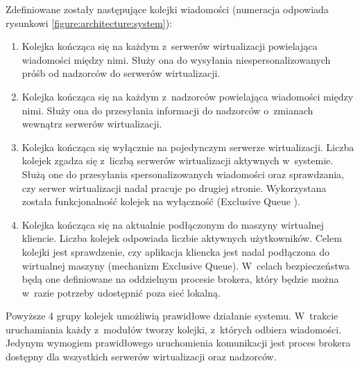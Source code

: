 \documentclass[../opis-rozwiazania.tex]{subfiles}
\begin{document}
Zdefiniowane zostały następujące kolejki wiadomości (numeracja odpowiada rysunkowi \ref{figure:architecture:system}):
\begin{enumerate}[label=(\Roman*)]
  \item \label{modules:broker:queue-virtsrv} Kolejka kończąca się na każdym z~serwerów wirtualizacji powielająca wiadomości między nimi.
        Służy ona do wysyłania niespersonalizowanych próśb od nadzorców do serwerów wirtualizacji.
  \item \label{modules:broker:queue-overseers} Kolejka kończąca się na każdym z~nadzorców powielająca wiadomości między nimi.
        Służy ona do przesyłania informacji do nadzorców o~zmianach wewnątrz serwerów wirtualizacji.
  \item \label{modules:broker:queue-exclusive} Kolejka kończąca się wyłącznie na pojedynczym serwerze wirtualizacji.
        Liczba kolejek zgadza się z~liczbą serwerów wirtualizacji aktywnych w~systemie.
        Służą one do przesyłania spersonalizowanych wiadomości oraz sprawdzania, czy serwer wirtualizacji nadal pracuje po drugiej stronie.
        Wykorzystana została funkcjonalność kolejek na wyłączność (Exclusive Queue \parencite{xrdp-clients}).
  \item \label{modules:broker:queue-users} Kolejka kończąca się na aktualnie podłączonym do maszyny wirtualnej kliencie.
        Liczba kolejek odpowiada liczbie aktywnych użytkowników.
        Celem kolejki jest sprawdzenie, czy aplikacja kliencka jest nadal podłączona do wirtualnej maszyny (mechanizm Exclusive Queue).
        W~celach bezpieczeństwa będą one definiowane na oddzielnym procesie brokera, który będzie można w~razie potrzeby udostępnić poza sieć lokalną.
\end{enumerate}

Powyższe 4 grupy kolejek umożliwią prawidłowe działanie systemu.
W~trakcie uruchamiania każdy z~modułów tworzy kolejki, z~których odbiera wiadomości.
Jedynym wymogiem prawidłowego uruchomienia komunikacji jest proces brokera dostępny dla wszystkich serwerów wirtualizacji oraz nadzorców.
\end{document}
